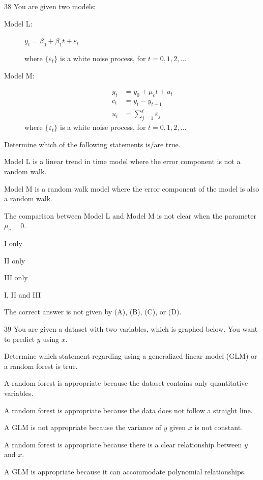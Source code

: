 \begin{question}{38}
You are given two models:

\begin{description}
\item[Model L:] $y_t = \beta_0 + \beta_1 t + \varepsilon_t$

where $\{\varepsilon_t\}$ is a white noise process, for $t = 0,1,2,\ldots$

\item[Model M:]
\begin{align*}
y_t &= y_0 + \mu_c t + u_t \\
c_t &= y_t - y_{t-1} \\
u_t &= \sum_{j=1}^{t} \varepsilon_j
\end{align*}
where $\{\varepsilon_t\}$ is a white noise process, for $t = 0,1,2,\ldots$
\end{description}

Determine which of the following statements is/are true.
\begin{statements}
\item Model L is a linear trend in time model where the error component is not a random walk.
\item Model M is a random walk model where the error component of the model is also a random walk.
\item The comparison between Model L and Model M is not clear when the parameter $\mu_c = 0$.
\end{statements}

\begin{choices}
\item I only
\item II only
\item III only
\item I, II and III
\item The correct answer is not given by (A), (B), (C), or (D).
\end{choices}
\end{question}

\begin{question}{39}
You are given a dataset with two variables, which is graphed below. You want to predict $y$ using $x$.


Determine which statement regarding using a generalized linear model (GLM) or a random forest is true.

\begin{choices}
\item A random forest is appropriate because the dataset contains only quantitative variables.
\item A random forest is appropriate because the data does not follow a straight line.
\item A GLM is not appropriate because the variance of $y$ given $x$ is not constant.
\item A random forest is appropriate because there is a clear relationship between $y$ and $x$.
\item A GLM is appropriate because it can accommodate polynomial relationships.
\end{choices}
\end{question}

